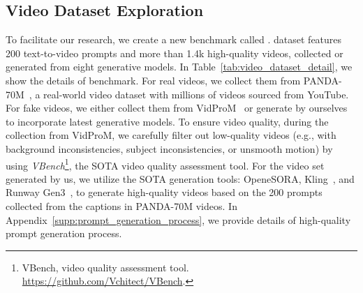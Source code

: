 \subsection{Video Dataset Exploration}
To facilitate our research, we create a new benchmark called \emph{\textbf{\vidfor}}. \vidfor dataset features 200 text-to-video prompts and more than 1.4k high-quality videos, collected or generated from eight generative models. In Table~\ref{tab:video_dataset_detail}, we show the details of \vidfor benchmark.
For real videos, we collect them from PANDA-70M~\cite{chen2024panda70mcaptioning70mvideos}, a real-world video dataset with millions of videos sourced from YouTube. 
For fake videos, we either collect them from VidProM~\cite{wang2024vidprommillionscalerealpromptgallery} or generate by ourselves to incorporate latest generative models. 
To ensure video quality, during the collection from VidProM, we carefully filter out low-quality videos (e.g., with background inconsistencies, subject inconsistencies, or unsmooth motion) by using \emph{VBench}\footnote{VBench, video quality assessment tool. \url{https://github.com/Vchitect/VBench}.}, the SOTA video quality assessment tool. 
For the video set generated by us, we utilize the SOTA generation tools: OpeneSORA, Kling~\cite{klingai}, and Runway Gen3~\cite{runway3}, to generate high-quality videos based on the 200 prompts collected from the captions in PANDA-70M videos. In Appendix~\ref{supp:prompt_generation_process}, we provide details of high-quality prompt generation process.

